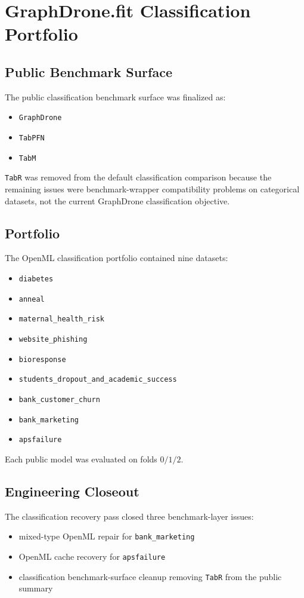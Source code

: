 \section{GraphDrone.fit Classification Portfolio}

\subsection{Public Benchmark Surface}

The public classification benchmark surface was finalized as:
\begin{itemize}
\item \texttt{GraphDrone}
\item \texttt{TabPFN}
\item \texttt{TabM}
\end{itemize}

\texttt{TabR} was removed from the default classification comparison because the remaining issues were benchmark-wrapper compatibility problems on categorical datasets, not the current GraphDrone classification objective.

\subsection{Portfolio}

The OpenML classification portfolio contained nine datasets:
\begin{itemize}
\item \texttt{diabetes}
\item \texttt{anneal}
\item \texttt{maternal\_health\_risk}
\item \texttt{website\_phishing}
\item \texttt{bioresponse}
\item \texttt{students\_dropout\_and\_academic\_success}
\item \texttt{bank\_customer\_churn}
\item \texttt{bank\_marketing}
\item \texttt{apsfailure}
\end{itemize}

Each public model was evaluated on folds $0/1/2$.

\subsection{Engineering Closeout}

The classification recovery pass closed three benchmark-layer issues:
\begin{itemize}
\item mixed-type OpenML repair for \texttt{bank\_marketing}
\item OpenML cache recovery for \texttt{apsfailure}
\item classification benchmark-surface cleanup removing \texttt{TabR} from the public summary
\end{itemize}

